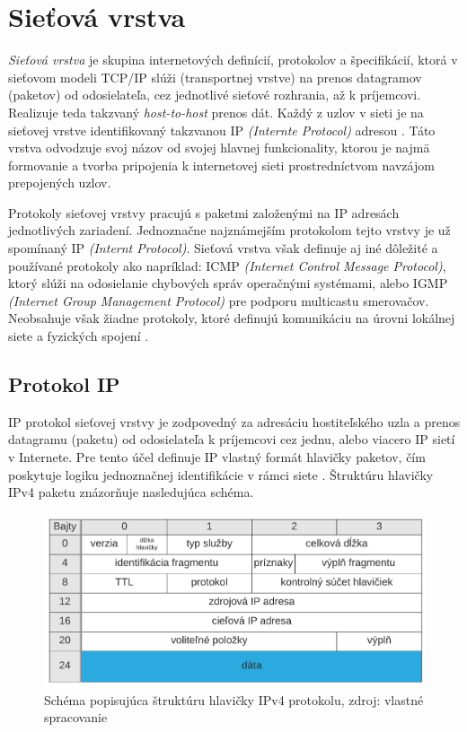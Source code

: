 \documentclass[
  printed, %
  table,   %
  lof,     %
  nolot,   %
  nocover
]{fithesis3}
\begin{document}
\section{Sieťová vrstva}
\textit{Sieťová vrstva} je skupina internetových definícií, protokolov a špecifikácií, ktorá
v sieťovom modeli TCP/IP slúži (transportnej vrstve) na prenos datagramov
(paketov) od odosielateľa, cez jednotlivé sieťové rozhrania, až k príjemcovi.
Realizuje teda takzvaný \textit{host-to-host} prenos dát.
Každý z uzlov v sieti je na sieťovej vrstve identifikovaný takzvanou IP
\textit{(Internte Protocol)} adresou \cite{rfc791}. Táto vrstva odvodzuje svoj názov od
svojej hlavnej funkcionality, ktorou je najmä formovanie a tvorba pripojenia k
internetovej sieti prostredníctvom navzájom prepojených uzlov.

Protokoly sieťovej vrstvy pracujú s paketmi založenými na IP adresách
jednotlivých zariadení. Jednoznačne najznámejším protokolom tejto vrstvy je už
spomínaný IP \textit{(Internt Protocol)}. Sieťová vrstva však definuje aj iné
dôležité a používané protokoly ako napríklad: ICMP
\textit{(Internet Control Message Protocol)}, ktorý slúži na odosielanie
chybových správ operačnými systémami, alebo IGMP
\textit{(Internet Group Management Protocol)} pre podporu multicastu smerovačov.
Neobsahuje však žiadne protokoly, ktoré definujú komunikáciu na
úrovni lokálnej siete a fyzických spojení \cite{rfc1122}.

\subsection{Protokol IP}
IP protokol sieťovej vrstvy je zodpovedný za adresáciu hostiteľského uzla a
prenos datagramu (paketu) od odosielateľa k príjemcovi cez jednu, alebo viacero
IP sietí v Internete. Pre tento účel definuje IP vlastný formát hlavičky paketov, čím
poskytuje logiku jednoznačnej identifikácie v rámci siete \cite{rfc791}. Štruktúru hlavičky
IPv4 paketu znázorňuje nasledujúca schéma.

\begin{figure}[h]
  \centering
    \includegraphics[width=.95\textwidth]{images/net-ip-head.png}
  \caption{Schéma popisujúca štruktúru hlavičky IPv4 protokolu, zdroj: vlastné spracovanie}
  \label{fig:net-ip-head}
\end{figure}
\end{document}
